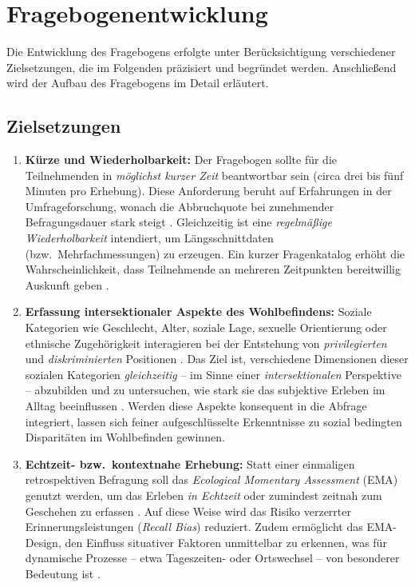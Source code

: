 \section{Fragebogenentwicklung}
\label{sec:fragebogen}

Die Entwicklung des Fragebogens erfolgte unter Berücksichtigung verschiedener Zielsetzungen, die im Folgenden präzisiert und begründet werden. Anschließend wird der Aufbau des Fragebogens im Detail erläutert.

\subsection{Zielsetzungen}
\label{subsec:zielsetzungen}

\begin{enumerate}[label=(Z\arabic*)]
    \item \textbf{Kürze und Wiederholbarkeit:} 
    Der Fragebogen sollte für die Teilnehmenden in \emph{möglichst kurzer Zeit} beantwortbar sein (circa drei bis fünf Minuten pro Erhebung). Diese Anforderung beruht auf Erfahrungen in der Umfrageforschung, wonach die Abbruchquote bei zunehmender Befragungsdauer stark steigt \parencite{dillman_internet_2014, bradburn_asking_2004}. Gleichzeitig ist eine \emph{regelmäßige Wiederholbarkeit} intendiert, um Längsschnittdaten (bzw.\ Mehrfachmessungen) zu erzeugen. Ein kurzer Fragenkatalog erhöht die Wahrscheinlichkeit, dass Teilnehmende an mehreren Zeitpunkten bereitwillig Auskunft geben \parencite{krosnick_question_2009}.

    \item \textbf{Erfassung intersektionaler Aspekte des Wohlbefindens:}
    Soziale Kategorien wie Geschlecht, Alter, soziale Lage, sexuelle Orientierung oder ethnische Zugehörigkeit interagieren bei der Entstehung von \emph{privilegierten} und \emph{diskriminierten} Positionen \parencite{crenshaw_mapping_1991, collins_black_2002}. Das Ziel ist, verschiedene Dimensionen dieser sozialen Kategorien \emph{gleichzeitig} – im Sinne einer \emph{intersektionalen} Perspektive – abzubilden und zu untersuchen, wie stark sie das subjektive Erleben im Alltag beeinflussen \parencite{rodo-de-zarate_developing_2014}. Werden diese Aspekte konsequent in die Abfrage integriert, lassen sich feiner aufgeschlüsselte Erkenntnisse zu sozial bedingten Disparitäten im Wohlbefinden gewinnen.

    \item \textbf{Echtzeit- bzw.\ kontextnahe Erhebung:}
    Statt einer einmaligen retrospektiven Befragung soll das \emph{Ecological Momentary Assessment} (EMA) genutzt werden, um das Erleben \emph{in Echtzeit} oder zumindest zeitnah zum Geschehen zu erfassen \parencite{shiffman_ecological_2008, stone_ecological_1994}. Auf diese Weise wird das Risiko verzerrter Erinnerungsleistungen (\emph{Recall Bias}) reduziert. Zudem ermöglicht das EMA-Design, den Einfluss situativer Faktoren unmittelbar zu erkennen, was für dynamische Prozesse – etwa Tageszeiten- oder Ortswechsel – von besonderer Bedeutung ist \parencite{bakolis_urban_2018}.


\end{enumerate}
